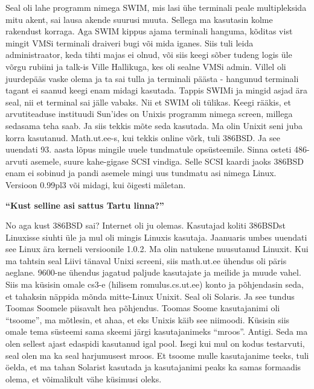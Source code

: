 Seal oli lahe programm nimega SWIM, mis lasi ühe terminali peale multipleksida
mitu akent, sai lausa akende suurusi muuta. Sellega ma kasutasin kolme
rakendust korraga. Aga SWIM kippus ajama terminali hanguma, kõditas vist mingit
VMSi terminali draiveri bugi või mida iganes. Siis tuli leida administraator,
keda tihti majas ei olnud, või siis keegi sõber tudeng logis üle võrgu
rubiini ja talk-is Ville
Hallikuga, kes oli sealne VMSi admin. Villel oli
juurdepääs vaske olema ja ta sai tulla ja terminali päästa - hangunud terminali
tagant ei saanud keegi enam midagi kasutada. Tappis SWIMi ja mingid asjad ära
seal, nii et terminal sai jälle vabaks. Nii et SWIM oli tülikas. Keegi rääkis,
et arvutiteaduse instituudi Sun'ides on Unixis programm nimega screen, millega
sedasama teha saab. Ja siis tekkis mõte seda kasutada. Ma olin Unixit seni juba
korra kasutanud. Math.ut.ee-s, kui tekkis online
võrk, tuli 386BSD. Ja see uuendati 93. aasta lõpus mingile
uuele tundmatule opsüsteemile. Sinna osteti 486-arvuti asemele, suure
kahe-gigase SCSI vindiga. Selle SCSI kaardi
jaoks 386BSD enam ei sobinud ja pandi asemele mingi uus tundmatu asi nimega
Linux. Versioon 0.99pl3 või midagi, kui õigesti mäletan.

\textbf{\enquote{Kust selline asi sattus Tartu linna?}}

No aga kust 386BSD sai? Internet oli ju olemas. Kasutajad koliti 386BSDst
Linuxisse siuhti üle ja mul oli mingis Linuxis kasutaja. Jaanuaris umbes
uuendati see Linux ära kerneli versioonile 1.0.2. Ma olin natukene nuusutanud
Linuxit. Kui ma tahtsin seal Liivi tänaval Unixi screeni, siis math.ut.ee
ühendus oli päris aeglane. 9600-ne ühendus jagatud paljude kasutajate ja meilide ja muude
vahel. Siis ma küsisin omale cs3-e (hilisem
romulus.cs.ut.ee) konto ja põhjendasin seda, et
tahaksin näppida mõnda mitte-Linux Unixit. Seal oli Solaris.
Ja see tundus Toomas Soomele piisavalt hea põhjendus.
Toomas Soome kasutajanimi oli \enquote{tsoome}, ma mõtlesin, et ahaa, et eks
Unixis käib see niimoodi. Küsisin siis omale tema süsteemi sama skeemi järgi
kasutajanimeks \enquote{mroos}. Antigi. Seda ma olen sellest ajast edaspidi
kasutanud igal pool. Isegi kui mul on kodus testarvuti, seal olen ma ka seal
harjumusest mroos. Et tsoome mulle kasutajanime teeks, tuli öelda, et ma tahan
Solarist kasutada ja kasutajanimi peaks ka samas formaadis olema, et
võimalikult vähe küsimusi oleks.

